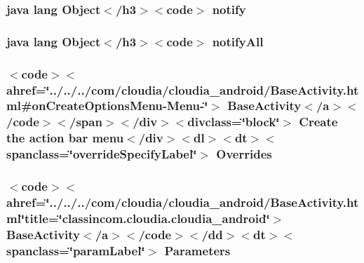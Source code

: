 \hypertarget{_show_all_activity_8html_ae99ae10b5010594dbda4794e02db271b}{
\subsubsection[{notify}]{\setlength{\rightskip}{0pt plus 5cm}java lang Object$<$/h3$>$$<$code$>$ notify}}\label{_show_all_activity_8html_ae99ae10b5010594dbda4794e02db271b}
\hypertarget{_show_all_activity_8html_a1279357e6e09e33e75b55eb05fdb6436}{
\subsubsection[{notify\-All}]{\setlength{\rightskip}{0pt plus 5cm}java lang Object$<$/h3$>$$<$code$>$ notify\-All}}\label{_show_all_activity_8html_a1279357e6e09e33e75b55eb05fdb6436}
\hypertarget{_show_all_activity_8html_aed76f90ed460c58c4a3ab820f77c466f}{
\subsubsection[{Overrides}]{\setlength{\rightskip}{0pt plus 5cm}$<$code$>$$<$ahref=\char`\"{}../../../com/cloudia/cloudia\-\_\-android/Base\-Activity.\-html\#{\bf on\-Create\-Options\-Menu}-\/Menu-\/\char`\"{}$>$ Base\-Activity$<$/{\bf a}$>$$<$/code$>$$<$/{\bf span}$>$$<$/div$>$$<$divclass=\char`\"{}block\char`\"{}$>$ Create the action bar {\bf menu}$<$/div$>$$<$dl$>$$<${\bf dt}$>$$<$spanclass=\char`\"{}override\-Specify\-Label\char`\"{}$>$ Overrides}}\label{_show_all_activity_8html_aed76f90ed460c58c4a3ab820f77c466f}
\hypertarget{_show_all_activity_8html_a4eb7712dd2f8cbf746bedba580f47f4d}{
\subsubsection[{Parameters}]{\setlength{\rightskip}{0pt plus 5cm}$<$code$>$$<$ahref=\char`\"{}../../../com/cloudia/cloudia\-\_\-android/Base\-Activity.\-html\char`\"{}title=\char`\"{}classincom.\-cloudia.\-cloudia\-\_\-android\char`\"{}$>$ Base\-Activity$<$/{\bf a}$>$$<$/code$>$$<$/{\bf dd}$>$$<${\bf dt}$>$$<$spanclass=\char`\"{}param\-Label\char`\"{}$>$ Parameters}}\label{_show_all_activity_8html_a4eb7712dd2f8cbf746bedba580f47f4d}
